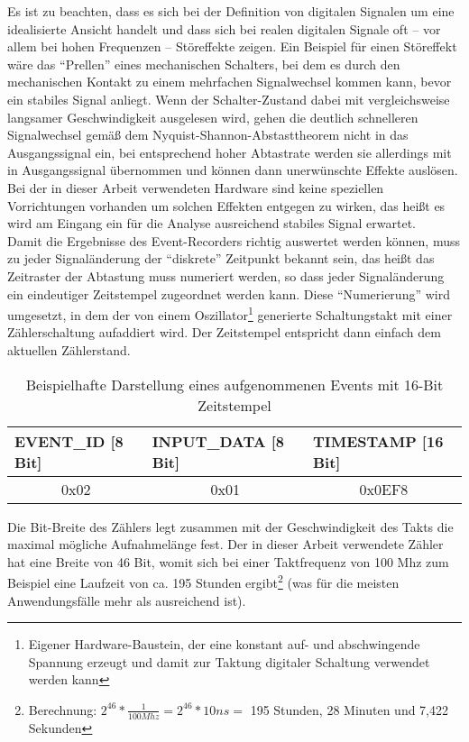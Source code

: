 Es ist zu beachten, dass es sich bei der Definition von digitalen Signalen um eine idealisierte Ansicht handelt und dass sich bei realen digitalen Signale oft -- vor allem bei hohen Frequenzen -- Störeffekte zeigen. Ein Beispiel für einen Störeffekt wäre das ``Prellen'' eines mechanischen Schalters, bei dem es durch den mechanischen Kontakt zu einem mehrfachen Signalwechsel kommen kann, bevor ein stabiles Signal anliegt. Wenn der Schalter-Zustand dabei mit vergleichsweise langsamer Geschwindigkeit ausgelesen wird, gehen die deutlich schnelleren Signalwechsel gemäß dem Nyquist-Shannon-Abstasttheorem nicht in das Ausgangssignal ein, bei entsprechend hoher Abtastrate werden sie allerdings mit in Ausgangssignal übernommen und können dann unerwünschte Effekte auslösen.\\
Bei der in dieser Arbeit verwendeten Hardware sind keine speziellen Vorrichtungen vorhanden um solchen Effekten entgegen zu wirken, das heißt es wird am Eingang ein für die Analyse ausreichend stabiles Signal erwartet.   \\

Damit die Ergebnisse des Event-Recorders richtig auswertet werden können, muss zu jeder Signaländerung der ``diskrete'' Zeitpunkt bekannt sein, das heißt das Zeitraster der Abtastung muss numeriert werden, so dass jeder Signaländerung ein eindeutiger Zeitstempel zugeordnet werden kann.
Diese ``Numerierung'' wird umgesetzt, in dem der von einem Oszillator\footnote{Eigener Hardware-Baustein, der eine konstant auf- und abschwingende Spannung erzeugt und damit zur Taktung digitaler Schaltung verwendet werden kann} generierte Schaltungstakt mit einer Zählerschaltung aufaddiert wird. Der Zeitstempel entspricht dann einfach dem aktuellen Zählerstand.\\


\begin{table}[h]
\centering
\begin{tabular}{|l|l|l|}
\hline
\rowcolor[HTML]{EFEFEF} 
	EVENT\_ID [8 Bit] & INPUT\_DATA [8 Bit] & TIMESTAMP [16 Bit]\\ \hline
	\multicolumn{1}{|c|}{0x02} & \multicolumn{1}{c|}{0x01} & \multicolumn{1}{c|}{0x0EF8} \\ \hline
\end{tabular}
\caption{Beispielhafte Darstellung eines aufgenommenen Events mit 16-Bit Zeitstempel}
\label{my-label}
\end{table}


Die Bit-Breite des Zählers legt zusammen mit der Geschwindigkeit des Takts die maximal mögliche Aufnahmelänge fest. Der in dieser Arbeit verwendete Zähler hat eine Breite von 46 Bit, womit sich bei einer Taktfrequenz von 100 Mhz zum Beispiel eine Laufzeit von ca. 195 Stunden ergibt\footnote{Berechnung: \(2^{46} * \frac{1}{100 Mhz} = 2^{46} * 10 ns =\) 195 Stunden, 28 Minuten und 7,422 Sekunden} (was für die meisten Anwendungsfälle mehr als ausreichend ist). 



